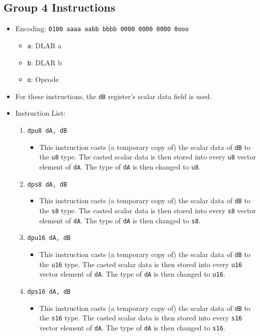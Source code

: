 \documentclass{article}
\begin{document}
	\subsection{Group 4 Instructions}
		\begin{itemize}
		\item Encoding: \texttt{0100 aaaa aabb bbbb  0000 0000 0000 0ooo}
			\begin{itemize}
			\item \texttt{a}: DLAR a
			\item \texttt{b}: DLAR b
			\item \texttt{o}: Opcode
			\end{itemize}
		\item For these instructions, the \texttt{dB} register's scalar
			data field is used.
		\item Instruction List:
			\begin{enumerate}
			\item \texttt{dpu8 dA, dB}
				\begin{itemize}
				\item This instruction casts (a temporary copy of) the
					scalar data of \texttt{dB} to the \texttt{u8} type. The
					casted scalar data is then stored into every
					\texttt{u8} vector element of \texttt{dA}. The type of
					\texttt{dA} is then changed to \texttt{u8}.
				\end{itemize}
			\item \texttt{dps8 dA, dB}
				\begin{itemize}
				\item This instruction casts (a temporary copy of) the
					scalar data of \texttt{dB} to the \texttt{s8} type. The
					casted scalar data is then stored into every
					\texttt{s8} vector element of \texttt{dA}. The type of
					\texttt{dA} is then changed to \texttt{s8}.
				\end{itemize}
			\item \texttt{dpu16 dA, dB}
				\begin{itemize}
				\item This instruction casts (a temporary copy of) the
					scalar data of \texttt{dB} to the \texttt{u16} type.
					The casted scalar data is then stored into every
					\texttt{u16} vector element of \texttt{dA}. The type of
					\texttt{dA} is then changed to \texttt{u16}.
				\end{itemize}
			\item \texttt{dps16 dA, dB}
				\begin{itemize}
				\item This instruction casts (a temporary copy of) the
					scalar data of \texttt{dB} to the \texttt{s16} type.
					The casted scalar data is then stored into every
					\texttt{s16} vector element of \texttt{dA}. The type of
					\texttt{dA} is then changed to \texttt{s16}.
				\end{itemize}


\end{enumerate}
\end{itemize}
\end{document}
